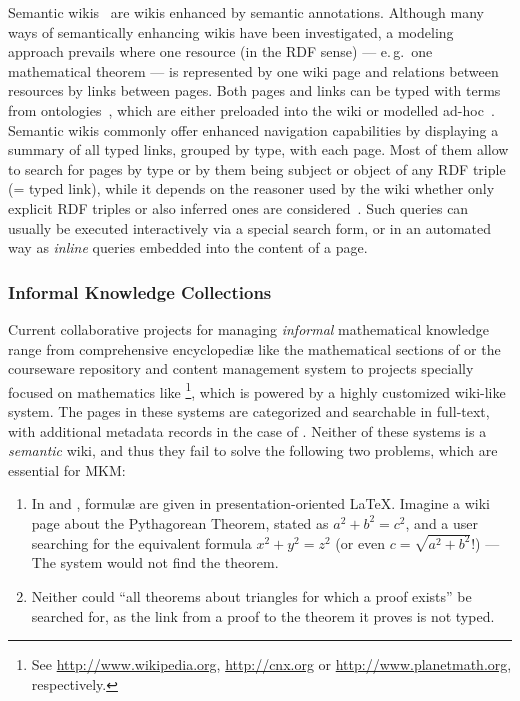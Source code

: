 Semantic wikis~\cite{semwiki06} are wikis enhanced by semantic annotations.  Although many
ways of semantically enhancing wikis have been investigated, a modeling approach prevails
where one resource (in the RDF sense) --- e.\,g.\ one mathematical theorem --- is
represented by one wiki page and relations between resources by links between pages.  Both
pages and links can be typed with terms from
ontologies~\cite{OrDeMoVoHa06:annotation-navigation-semwiki}, which are either preloaded
into the wiki or modelled ad-hoc~\cite{KrSchVr:semwiki-reasoning07}.  Semantic wikis
commonly offer enhanced navigation capabilities by displaying a summary of all typed
links, grouped by type, with each page.  Most of them allow to search for pages by type or
by them being subject or object of any RDF triple (= typed link), while it depends on the
reasoner used by the wiki whether only explicit RDF triples or also inferred ones are
considered~\cite{KrSchVr:semwiki-reasoning07}.  Such queries can usually be executed
interactively via a special search form, or in an automated way as \emph{inline} queries
embedded into the content of a page.

\subsubsection{Informal Knowledge Collections}
\label{sec:math-knowledge-collections}

Current collaborative projects for managing \emph{informal} mathematical knowledge range
from comprehensive encyclopediæ like the mathematical sections of  or
the courseware repository and content management system  to projects
specially focused on mathematics like \footnote{See
  \url{http://www.wikipedia.org}, \url{http://cnx.org} or \url{http://www.planetmath.org},
  respectively.}, which is powered by a highly customized wiki-like system.  The pages in
these systems are categorized and searchable in full-text, with additional metadata
records in the case of .  Neither of these systems is a
\emph{semantic} wiki, and thus they fail to solve the following two problems, which are
essential for MKM:

\begin{enumerate}
\item\label{item:formula-search-usecase} In  and ,
  formulæ are given in presentation-oriented {\LaTeX}.  Imagine a wiki page about the
  Pythagorean Theorem, stated as $a^2 + b^2 = c^2$, and a user searching for the
  equivalent formula $x^2 + y^2 = z^2$ (or even $c=\sqrt{a^2+b^2}$!) --- The system would
  not find the theorem.
\item Neither could ``all theorems about triangles for which a
  proof exists'' be searched for, as the link from a proof to the theorem it proves is not
  typed.
\end{enumerate}

